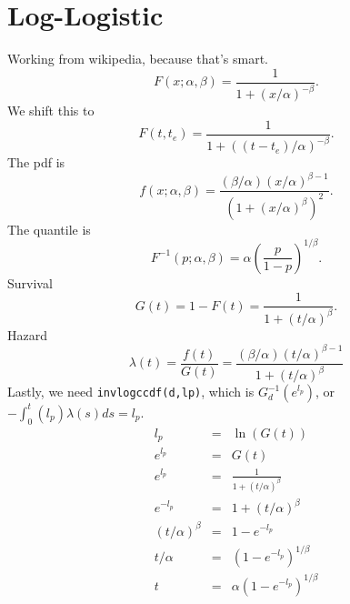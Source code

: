 \documentclass{article}
\newcommand{\code}[1]{\texttt{#1}}
\begin{document}

\section{Log-Logistic}
Working from wikipedia, because that's smart.
\begin{equation}
  F(x;\alpha, \beta)=\frac{1}{1+(x/\alpha)^{-\beta}}.
\end{equation}
We shift this to
\begin{equation}
  F(t, t_e)=\frac{1}{1+((t-t_e)/\alpha)^{-\beta}}.
\end{equation}
The pdf is
\begin{equation}
  f(x;\alpha, \beta)=\frac{(\beta/\alpha)(x/\alpha)^{\beta-1}}
  {(1+(x/\alpha)^\beta)^2}.
\end{equation}
The quantile is
\begin{equation}
  F^{-1}(p; \alpha, \beta)=\alpha \left(\frac{p}{1-p}\right)^{1/\beta}.
\end{equation}
Survival
\begin{equation}
  G(t)=1-F(t)=\frac{1}{1+(t/\alpha)^\beta}.
\end{equation}
Hazard
\begin{equation}
  \lambda(t)=\frac{f(t)}{G(t)}=\frac{(\beta/\alpha)(t/\alpha)^{\beta-1}}
  {1+(t/\alpha)^\beta}
\end{equation}
Lastly, we need \code{invlogccdf(d,lp)}, which is $G_d^{-1}(e^{l_p})$,
or $-\int_0^t(l_p)\lambda(s)ds=l_p$.
\begin{eqnarray}
  l_p&=&\ln(G(t)) \\
  e^{l_p}&=&G(t) \\
  e^{l_p}&=&\frac{1}{1+(t/\alpha)^\beta} \\
  e^{-l_p}&=&1+(t/\alpha)^\beta \\
  (t/\alpha)^\beta&=&  1-e^{-l_p}\\
  t/\alpha&=& (1-e^{-l_p})^{1/\beta}\\
   t&=&\alpha(1-e^{-l_p})^{1/\beta}\\
\end{eqnarray}



\end{document}

